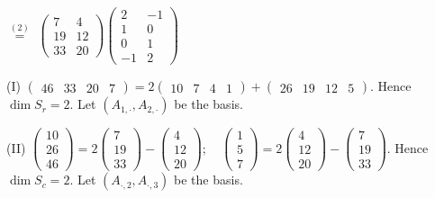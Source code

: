 \documentclass[a4paper, 11pt, UTF8]{article}
\def\EndI{\hspace{-4.3pt}}
\begin{document}
\begin{large}
{{$\overset{(2)}{=}$}
$\begin{pmatrix} 7 & 4\\ 19 & 12\\ 33 & 20\end{pmatrix}\begin{pmatrix} 2 & -1\\ 1 & 0\\ 0 & 1\\ -1 & 2\end{pmatrix}$}\par\quad
(I) {\normalsize$\begin{pmatrix} 46 & 33 & 20 & 7 \end{pmatrix}=2\begin{pmatrix} 10 & 7 & 4 & 1\end{pmatrix}+\begin{pmatrix} 26 & 19 & 12 & 5\end{pmatrix}$}.
Hence $\dim S_r=2$. Let $(A_{1,\cdot},A_{2,\cdot})$ be the basis.\par\vspace{6pt}\quad\EndI
(II) {\normalsize$\begin{pmatrix} 10\\ 26\\ 46\end{pmatrix}=2\begin{pmatrix} 7\\ 19\\ 33\end{pmatrix}-\begin{pmatrix} 4\\ 12\\ 20\end{pmatrix}; \quad \begin{pmatrix} 1\\ 5\\ 7\end{pmatrix}=2\begin{pmatrix} 4\\ 12\\ 20\end{pmatrix}-\begin{pmatrix} 7\\ 19\\ 33\end{pmatrix}$}. Hence $\dim S_c=2.$ Let $(A_{\cdot,2},A_{\cdot,3})$ be the basis.\vspace{6pt}\par
\SepLine\par


\end{large}
\end{document}
